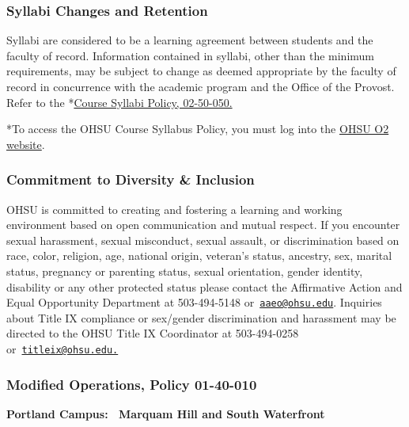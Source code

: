 \documentclass[
  letterpaper,
  DIV=11,
  numbers=noendperiod]{scrartcl}
\begin{document}
\hypertarget{syllabi-changes-and-retention}{%
\subsubsection{Syllabi Changes and
Retention}\label{syllabi-changes-and-retention}}

Syllabi are considered to be a learning agreement between students and
the faculty of record. Information contained in syllabi, other than the
minimum requirements, may be subject to change as deemed appropriate by
the faculty of record in concurrence with the academic program and the
Office of the Provost. Refer to the
*\href{https://o2.ohsu.edu/policies-and-compliance/ohsu-policy-manual/chapter-2-student-affairs/ohsu-policy-02-50-050.cfm}{Course
Syllabi Policy, 02-50-050.}

*To access the OHSU Course Syllabus Policy, you must log into the
\protect\hyperlink{0}{OHSU O2 website}.

\hypertarget{commitment-to-diversity-inclusion}{%
\subsubsection{Commitment to Diversity \&
Inclusion}\label{commitment-to-diversity-inclusion}}

OHSU is committed to creating and fostering a learning and working
environment based on open communication and mutual respect. If you
encounter sexual harassment, sexual misconduct, sexual assault, or
discrimination based on race, color, religion, age, national origin,
veteran's status, ancestry, sex, marital status, pregnancy or parenting
status, sexual orientation, gender identity, disability or any other
protected status please contact the Affirmative Action and Equal
Opportunity Department at 503-494-5148
or~\href{mailto:aaeo@ohsu.edu}{\nolinkurl{aaeo@ohsu.edu}}. Inquiries
about Title IX compliance or sex/gender discrimination and harassment
may be directed to the OHSU Title IX Coordinator at 503-494-0258
or~\href{mailto:titleix@ohsu.edu.}{\nolinkurl{titleix@ohsu.edu.}}

\hypertarget{modified-operations-policy-01-40-010}{%
\subsubsection{Modified Operations, Policy
01-40-010}\label{modified-operations-policy-01-40-010}}

\textbf{Portland Campus:~ Marquam Hill and South Waterfront}
\end{document}

